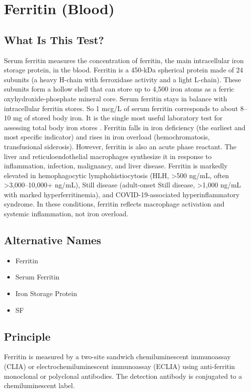 \chapter{Ferritin (Blood)}
\section*{What Is This Test?}
Serum ferritin measures the concentration of ferritin, the main intracellular iron storage protein, in the blood. Ferritin is a 450-kDa spherical protein made of 24 subunits (a heavy H-chain with ferroxidase activity and a light L-chain). These subunits form a hollow shell that can store up to 4,500 iron atoms as a ferric oxyhydroxide-phosphate mineral core. Serum ferritin stays in balance with intracellular ferritin stores. So 1 mcg/L of serum ferritin corresponds to about 8--10 mg of stored body iron. It is the single most useful laboratory test for assessing total body iron stores \cite{camaschella2015iron}. Ferritin falls in iron deficiency (the earliest and most specific indicator) and rises in iron overload (hemochromatosis, transfusional siderosis). However, ferritin is also an acute phase reactant. The liver and reticuloendothelial macrophages synthesize it in response to inflammation, infection, malignancy, and liver disease. Ferritin is markedly elevated in hemophagocytic lymphohistiocytosis (HLH, >500 ng/mL, often >3,000--10,000+ ng/mL), Still disease (adult-onset Still disease, >1,000 ng/mL with marked hyperferritinemia), and COVID-19-associated hyperinflammatory syndrome. In these conditions, ferritin reflects macrophage activation and systemic inflammation, not iron overload.
\section*{Alternative Names}
\begin{itemize}
  \item Ferritin
  \item Serum Ferritin
  \item Iron Storage Protein
  \item SF
\end{itemize}
\section*{Principle}
Ferritin is measured by a two-site sandwich chemiluminescent immunoassay (CLIA) or electrochemiluminescent immunoassay (ECLIA) using anti-ferritin monoclonal or polyclonal antibodies. The detection antibody is conjugated to a chemiluminescent label.
